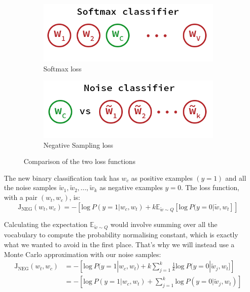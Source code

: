\begin{figure}[H]
    \begin{subfigure}{.5\textwidth}
        \centering
        \includegraphics[width=0.9\linewidth]{Images/discri-softmax.png}
        \caption{Softmax loss}
    \end{subfigure}
    \begin{subfigure}{.5\textwidth}
        \centering
        \includegraphics[width=0.9\linewidth]{Images/discri-noise.png}
        \caption{Negative Sampling loss}
    \end{subfigure}
    \caption{Comparison of the two loss functions}
    \label{discri}
\end{figure}

The new binary classification task has $w_c$ as positive examples $(y=1)$ and all the noise samples $\tilde{w}_1, \tilde{w}_2, ..., \tilde{w}_k$  as negative examples $y=0$. The loss function, with a pair $(w_t, w_c)$, is:
\begin{equation}
    \text{J}_{\text{NEG}}(w_t, w_c)  = -[\text{log}~P(y=1| w_c, w_t) + k\mathbb{E}_{\tilde{w}\sim Q}[\text{log}~P(y=0|\tilde{w}, w_t]]
\end{equation}

Calculating the expectation $\mathbb{E}_{\tilde{w}\sim Q}$ would involve summing over all the vocabulary to compute the probability normalising constant, which is exactly what we wanted to avoid in the first place. That's why we will instead use a Monte Carlo approximation with our noise samples:
\begin{align}
    \text{J}_{\text{NEG}}(w_t, w_c)  &= -\left[\text{log}~P(y=1| w_c, w_t) + k\sum_{j=1}^{k}\frac{1}{k}\text{log}~P(y=0|\tilde{w}_j, w_t]\right]\nonumber \\
     &= -\left[\text{log}~P(y=1| w_c, w_t) + \sum_{j=1}^k\text{log}~P(y=0|\tilde{w}_j, w_t)\right]
\end{align}

